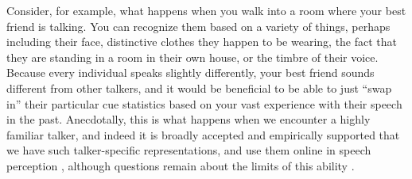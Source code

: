 Consider, for example, what happens when you walk into a room where your best friend is talking.  You can recognize them based on a variety of things, perhaps including their face, distinctive clothes they happen to be wearing, the fact that they are standing in a room in their own house, or the timbre of their voice.  Because every individual speaks slightly differently, your best friend sounds different from other talkers, and it would be beneficial to be able to just ``swap in'' their particular cue statistics based on your vast experience with their speech in the past.  Anecdotally, this is what happens when we encounter a highly familiar talker, and indeed it is broadly accepted and empirically supported that we have such talker-specific representations, and use them online in speech perception \cite{Creel2008,Creel2011,Goldinger1996,Nygaard1998,Palmeri1993,Remez1997}, although questions remain about the limits of this ability \cite{Magnuson2007a,Pardo2006}.

